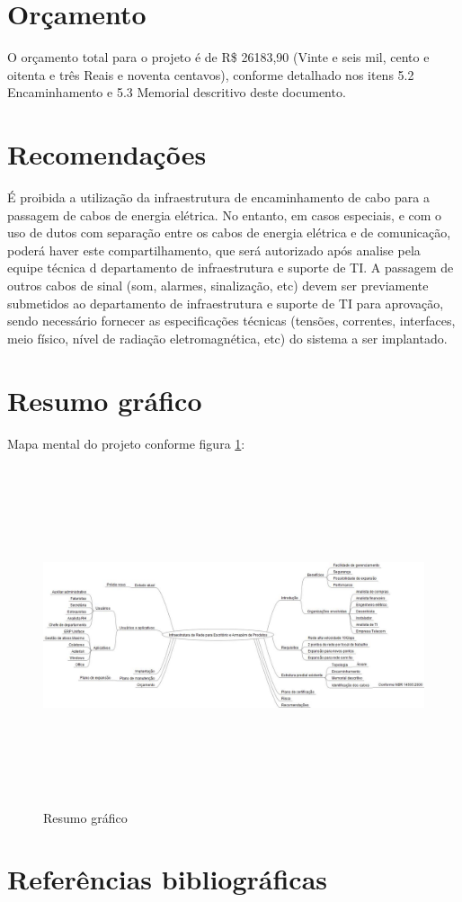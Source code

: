 \documentclass[	DIV=calc,%
							paper=a4,%
							fontsize=12pt,%
							onecolumn]{scrartcl}	 					%
\begin{document}
\section{Orçamento}
O orçamento total para o projeto é de R\$ 26183,90 (Vinte e seis mil, cento e oitenta e três Reais e noventa centavos), conforme detalhado nos itens 5.2 Encaminhamento e 5.3 Memorial descritivo deste documento. 

\section{Recomendações}
É proibida a utilização da infraestrutura de encaminhamento de cabo para a passagem de cabos de energia
elétrica. No entanto, em casos especiais, e com o uso de dutos com separação entre os cabos de energia elétrica e
de comunicação, poderá haver este compartilhamento, que será autorizado após analise pela equipe técnica d
departamento de infraestrutura e suporte de TI. A passagem de outros cabos de sinal (som, alarmes, sinalização, etc) devem ser previamente submetidos ao departamento de infraestrutura e suporte de TI para aprovação, sendo necessário fornecer as especificações técnicas (tensões, correntes, interfaces, meio físico, nível de radiação eletromagnética, etc) do sistema a ser implantado.

\section{Resumo gráfico}

Mapa mental do projeto conforme figura \ref{mapa_mental}:

\begin{figure}[h]
	\centering
	\includegraphics[width=\textwidth,height=10cm,keepaspectratio]{mapa_mental}
	\caption{Resumo gráfico}
	\label{mapa_mental}	
\end{figure}

\section{Referências bibliográficas}

\renewcommand\refname{} %

  
\end{document}
